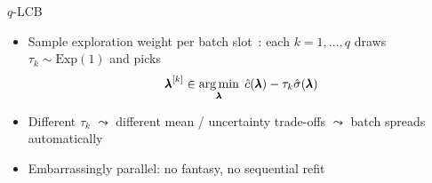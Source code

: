 \documentclass[main]{subfiles}
\begin{document}
\begin{frame}[t]{$q$-LCB}
  \begin{itemize}
    \item Sample exploration weight per batch slot~: each $k = 1, \ldots, q$ draws $\tau_k \sim \mathrm{Exp}(1)$ and picks
        $${\pmb{\lambda}}^{[k]} \in \operatorname*{arg\,min}_{\pmb{\lambda}} \;\hat{c}(\pmb{\lambda}) - \tau_k \hat{\sigma}(\pmb{\lambda})$$
    \item Different $\tau_k$ $\leadsto$ different mean / uncertainty trade-offs $\leadsto$ batch spreads automatically
    \item Embarrassingly parallel: no fantasy, no sequential refit
  \end{itemize}
\end{frame}


\end{document}

